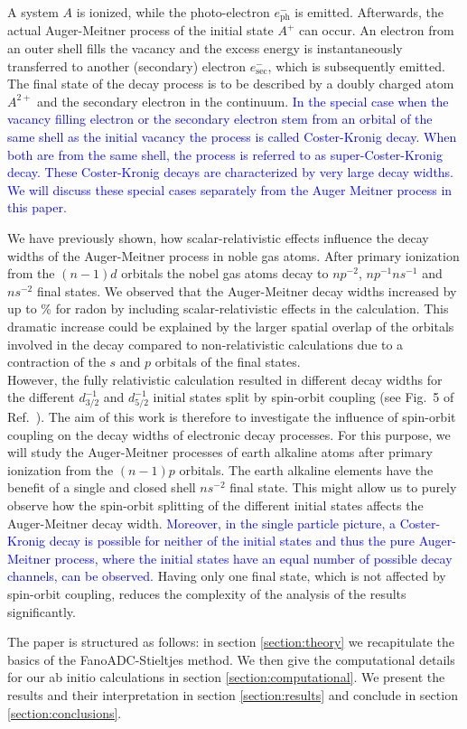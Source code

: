 A system $A$ is ionized, while the photo-electron $e^-_\text{ph}$ is emitted.      
Afterwards, the actual Auger-Meitner
process of the initial state $A^+$ can occur.    
An electron from an outer                                       
shell fills the vacancy and the excess energy is instantaneously transferred  
to another (secondary) electron $e^-_\text{sec}$, which
is subsequently emitted. The final state of the decay process   
is to be described by a doubly charged atom $A^{2+}$ and the secondary        
electron in the continuum.
\textcolor{blue}
{In the special case when the vacancy filling electron or the secondary
electron stem from an orbital
of the same shell as the initial vacancy the process is called Coster-Kronig decay.
When both are from the same shell, the process is referred to as super-Coster-Kronig
decay. These Coster-Kronig decays are characterized by very large decay widths.
\cite{Coster35} We will discuss these special cases separately from the 
Auger Meitner process in this paper.
}

We have previously shown, how
scalar-relativistic effects influence the decay widths of the Auger-Meitner
process in
noble gas atoms. \cite{Fasshauer15_1}
After primary ionization from the $(n-1)d$ orbitals the nobel
gas atoms decay to $np^{-2}$, $np^{-1}ns^{-1}$ and $ns^{-2}$ final states.
We observed that the Auger-Meitner decay widths increased by up to \unit[326]{\%}
for radon
by including scalar-relativistic effects in the calculation. This
dramatic increase could be explained by the larger spatial
overlap of the orbitals
involved in the decay compared to non-relativistic calculations due to
a contraction of the $s$ and $p$ orbitals of the final states.\\
However, the fully relativistic calculation resulted in different decay widths
for the different $d_{3/2}^{-1}$ and $d_{5/2}^{-1}$ initial states split by
spin-orbit coupling (see Fig.~5 of Ref.~\cite{Fasshauer15_1}).
The aim of this work is therefore to investigate the
influence of spin-orbit coupling on the decay widths of electronic decay processes.
For this purpose, we will study the Auger-Meitner processes of earth alkaline atoms
after primary ionization from the $(n-1)p$ orbitals. The earth alkaline elements
have the benefit of a single and closed shell $ns^{-2}$ final state.
This might allow us to purely observe how the spin-orbit splitting of
the different initial states affects the Auger-Meitner decay width.
\textcolor{blue}
{
Moreover, in the single particle picture, a Coster-Kronig decay is possible for neither
of the initial states and thus the pure Auger-Meitner process, where the initial
states have an equal number of possible decay channels, can be observed.
}
Having only one final state, which is not affected by spin-orbit coupling,
reduces the complexity of the analysis of the results significantly.

The paper is structured as follows:
in section \ref{section:theory} we recapitulate the basics of the
FanoADC-Stieltjes method. We then give the computational details for our
ab initio calculations in section \ref{section:computational}. We present the
results and their interpretation in section \ref{section:results}
and conclude in section \ref{section:conclusions}.
